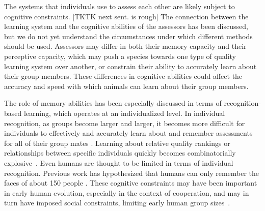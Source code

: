 The systems that individuals use to assess each other are likely subject to cognitive constraints. [TKTK next sent. is rough] The connection between the learning system and the cognitive abilities of the assessors has been discussed, but we do not yet understand the circumstances under which different methods should be used. Assessors may differ in both their memory capacity and their perceptive capacity, which may push a species towards one type of quality learning system over another, or constrain their ability to accurately learn about their group members. These differences in cognitive abilities could affect the accuracy and speed with which animals can learn about their group members. 

The role of memory abilities has been especially discussed in terms of recognition-based learning, which  operates at an individualized level. In individual recognition, as groups become larger and larger, it becomes more difficult for individuals to effectively and accurately learn about and remember assessments for all of their group mates \citep{Rohwer:1982fk,Solberg:1997uq}. Learning about relative quality rankings or relationships between specific individuals quickly becomes combinatorially explosive~\citep{Seyfarth2015SocialCognition}. Even humans are thought to be limited in terms of individual recognition. Previous work has hypothesized that humans can only remember the faces of about 150 people \citep{Dunbar:1993zr,Hill:2003ly}. These cognitive constraints may have been important in early human evolution, especially in the context of cooperation, and may in turn have imposed social constraints, limiting early human group sizes~\citep{Dunbar:1992ys,Dunbar:1993zr}. 

